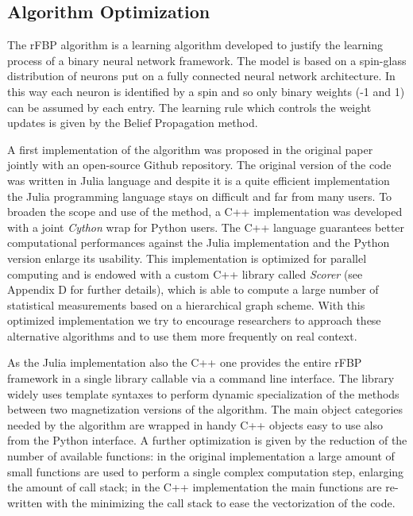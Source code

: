 \documentclass{standalone}
\begin{document}
\subsection[Algorithm Optimization]{Algorithm Optimization}\label{rfbp:rFBP}

The rFBP algorithm is a learning algorithm developed to justify the learning process of a binary neural network framework.
The model is based on a spin-glass distribution of neurons put on a fully connected neural network architecture.
In this way each neuron is identified by a spin and so only binary weights (-1 and 1) can be assumed by each entry.
The learning rule which controls the weight updates is given by the Belief Propagation method.

A first implementation of the algorithm was proposed in the original paper~\cite{BaldassiE7655} jointly with an open-source Github repository.
The original version of the code was written in Julia language and despite it is a quite efficient implementation the Julia programming language stays on difficult and far from many users.
To broaden the scope and use of the method, a C++ implementation was developed with a joint \emph{Cython} wrap for Python users.
The C++ language guarantees better computational performances against the Julia implementation and the Python version enlarge its usability.
This implementation is optimized for parallel computing and is endowed with a custom C++ library called \emph{Scorer} (see Appendix D for further details), which is able to compute a large number of statistical measurements based on a hierarchical graph scheme.
With this optimized implementation we try to encourage researchers to approach these alternative algorithms and to use them more frequently on real context.

As the Julia implementation also the C++ one provides the entire rFBP framework in a single library callable via a command line interface.
The library widely uses template syntaxes to perform dynamic specialization of the methods between two magnetization versions of the algorithm.
The main object categories needed by the algorithm are wrapped in handy C++ objects easy to use also from the Python interface.
A further optimization is given by the reduction of the number of available functions: in the original implementation a large amount of small functions are used to perform a single complex computation step, enlarging the amount of call stack; in the C++ implementation the main functions are re-written with the minimizing the call stack to ease the vectorization of the code.
\end{document}
